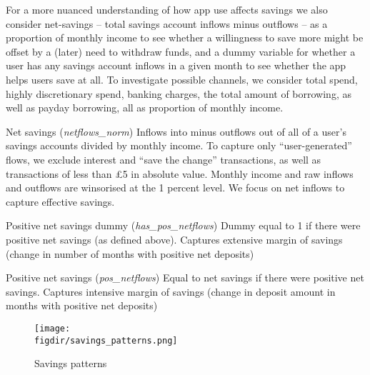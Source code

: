 For a more nuanced understanding of how app use affects savings we also
consider net-savings -- total savings account inflows minus outflows -- as a
proportion of monthly income to see whether a willingness to save more might be
offset by a (later) need to withdraw funds, and a dummy variable for whether a
user has any savings account inflows in a given month to see whether the app
helps users save at all. To investigate possible channels, we consider total
spend, highly discretionary spend, banking charges, the total amount of
borrowing, as well as payday borrowing, all as proportion of monthly income.



Net savings (\textit{netflows\_norm})
Inflows into minus outflows out of all of a user's savings accounts divided
by monthly income. To capture only ``user-generated'' flows, we exclude
interest and ``save the change'' transactions, as well as transactions of
less than \pounds5 in absolute
value. Monthly income and raw inflows and outflows are winsorised at the 1
percent level.
We focus on net inflows to capture effective savings.

Positive net savings dummy (\textit{has\_pos\_netflows})
Dummy equal to 1 if there were positive net savings (as defined above).
Captures extensive margin of savings (change in number of months with positive
net deposits)

Positive net savings (\textit{pos\_netflows})
Equal to net savings if there were positive net savings.
Captures intensive margin of savings (change in deposit amount in months with
positive net deposits)

\begin{figure}[H]
    \centering
    \caption{Savings patterns}%
    \texttt{[image: \\figdir/savings\_patterns.png]}
    \label{fig:\figdir/savings_patterns}

\end{figure}


